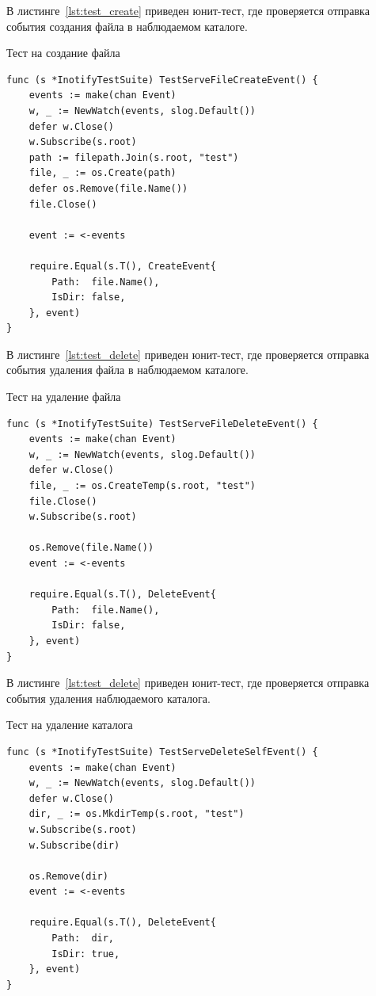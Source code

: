 \documentclass[14pt, russian]{scrartcl}
\begin{document}
В листинге~\ref{lst:test_create} приведен юнит-тест, где проверяется отправка
события создания файла в наблюдаемом каталоге.

\begin{listing}[H]
\caption{Тест на создание файла}
\label{lst:test_create}
\begin{verbatim}
func (s *InotifyTestSuite) TestServeFileCreateEvent() {
	events := make(chan Event)
	w, _ := NewWatch(events, slog.Default())
	defer w.Close()
	w.Subscribe(s.root)
	path := filepath.Join(s.root, "test")
	file, _ := os.Create(path)
	defer os.Remove(file.Name())
	file.Close()

	event := <-events

	require.Equal(s.T(), CreateEvent{
		Path:  file.Name(),
		IsDir: false,
	}, event)
}
\end{verbatim}
\end{listing}

В листинге~\ref{lst:test_delete} приведен юнит-тест, где проверяется отправка
события удаления файла в наблюдаемом каталоге.

\begin{listing}[H]
\caption{Тест на удаление файла}
\label{lst:test_delete}
\begin{verbatim}
func (s *InotifyTestSuite) TestServeFileDeleteEvent() {
	events := make(chan Event)
	w, _ := NewWatch(events, slog.Default())
	defer w.Close()
	file, _ := os.CreateTemp(s.root, "test")
	file.Close()
	w.Subscribe(s.root)

	os.Remove(file.Name())
	event := <-events

	require.Equal(s.T(), DeleteEvent{
		Path:  file.Name(),
		IsDir: false,
	}, event)
}
\end{verbatim}
\end{listing}

В листинге~\ref{lst:test_delete} приведен юнит-тест, где проверяется отправка
события удаления наблюдаемого каталога.

\begin{listing}[H]
\caption{Тест на удаление каталога}
\label{lst:test_delete_self}
\begin{verbatim}
func (s *InotifyTestSuite) TestServeDeleteSelfEvent() {
	events := make(chan Event)
	w, _ := NewWatch(events, slog.Default())
	defer w.Close()
	dir, _ := os.MkdirTemp(s.root, "test")
	w.Subscribe(s.root)
	w.Subscribe(dir)

	os.Remove(dir)
	event := <-events

	require.Equal(s.T(), DeleteEvent{
		Path:  dir,
		IsDir: true,
	}, event)
}
\end{verbatim}
\end{listing}
\end{document}

